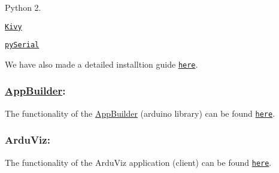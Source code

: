 \begin{DoxyItemize}
\item Python 2.
\item \href{http://kivy.org}{\tt Kivy}
\item \href{http://pyserial.sourceforge.net}{\tt py\+Serial}
\end{DoxyItemize}

We have also made a detailed installtion guide \href{md_documentation_appb_intro.html}{\tt here}.

\subsubsection*{\hyperlink{class_app_builder}{App\+Builder}\+:}

The functionality of the \hyperlink{class_app_builder}{App\+Builder} (arduino library) can be found \href{md_documentation_installation.html}{\tt here}.

\subsubsection*{Ardu\+Viz\+:}

The functionality of the Ardu\+Viz application (client) can be found \href{md_documentation_arduviz_intro.html}{\tt here}. 